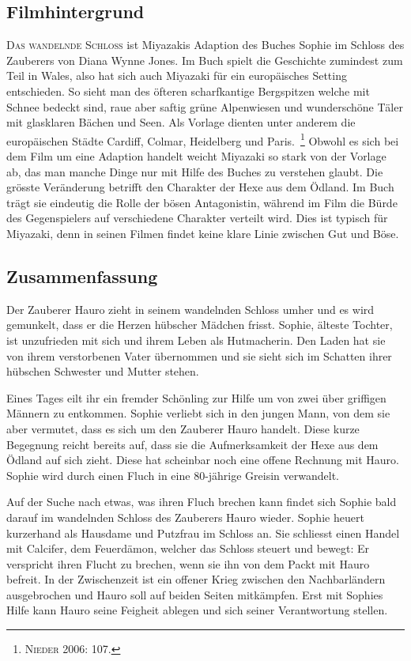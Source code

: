 \subsection{Filmhintergrund}
\textsc{Das wandelnde Schloss} ist Miyazakis Adaption des Buches \glqq Sophie im Schloss des Zauberers \grqq von Diana Wynne Jones. Im Buch spielt die Geschichte zumindest zum Teil in Wales, also hat sich auch Miyazaki für ein europäisches Setting entschieden. So sieht man des öfteren scharfkantige Bergspitzen welche mit Schnee bedeckt sind, raue aber saftig grüne Alpenwiesen und wunderschöne Täler mit glasklaren Bächen und Seen. Als Vorlage dienten unter anderem die europäischen Städte Cardiff, Colmar, Heidelberg und Paris.~\footnote{\textsc{Nieder} 2006: 107.} Obwohl es sich bei dem Film um eine Adaption handelt weicht Miyazaki so stark von der Vorlage ab, das man manche Dinge nur mit Hilfe des Buches zu verstehen glaubt. Die grösste Veränderung betrifft den Charakter der Hexe aus dem Ödland. Im Buch trägt sie eindeutig die Rolle der bösen Antagonistin, während im Film die Bürde des Gegenspielers auf verschiedene Charakter verteilt wird. Dies ist typisch für Miyazaki, denn in seinen Filmen findet keine klare Linie zwischen Gut und Böse. 

\subsection{Zusammenfassung}
Der Zauberer Hauro zieht in seinem wandelnden Schloss umher und es wird gemunkelt, dass er die Herzen hübscher Mädchen frisst. Sophie, älteste Tochter, ist unzufrieden mit sich und ihrem Leben als Hutmacherin. Den Laden hat sie von ihrem verstorbenen Vater übernommen und sie sieht sich im Schatten ihrer hübschen Schwester und Mutter stehen. 

Eines Tages eilt ihr ein fremder Schönling zur Hilfe um von zwei über griffigen Männern zu entkommen. Sophie verliebt sich in den jungen Mann, von dem sie aber vermutet, dass es sich um den Zauberer Hauro handelt. Diese kurze Begegnung reicht bereits auf, dass sie die Aufmerksamkeit der Hexe aus dem Ödland auf sich zieht. Diese hat scheinbar noch eine offene Rechnung mit Hauro. Sophie wird durch einen Fluch in eine 80-jährige Greisin verwandelt. 

Auf der Suche nach etwas, was ihren Fluch brechen kann findet sich Sophie bald darauf im wandelnden Schloss des Zauberers Hauro wieder. Sophie heuert kurzerhand als Hausdame und Putzfrau im Schloss an. Sie schliesst einen Handel mit Calcifer, dem Feuerdämon, welcher das Schloss steuert und bewegt: Er verspricht ihren Flucht zu brechen, wenn sie ihn von dem Packt mit Hauro befreit. In der Zwischenzeit ist ein offener Krieg zwischen den Nachbarländern ausgebrochen und Hauro soll auf beiden Seiten mitkämpfen. Erst mit Sophies Hilfe kann Hauro seine Feigheit ablegen und sich seiner Verantwortung stellen. 

